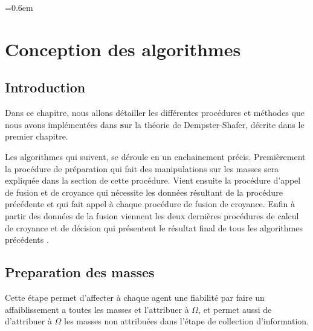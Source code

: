 \parskip=0.6em
\chapter{Conception des algorithmes}


\section*{Introduction}

Dans ce chapitre, nous allons détailler les différentes procédures et méthodes que nous avons implémentées dans \textbf sur la théorie de Dempster-Shafer, décrite dans le premier chapitre.

Les algorithmes qui suivent, se déroule en un enchainement précis.
Premièrement la procédure de préparation qui fait des manipulations sur les masses sera expliquée dans la section de cette procédure. Vient ensuite la procédure d'appel de fusion et de croyance qui nécessite les données résultant de la procédure précédente et qui fait appel à chaque procédure de fusion de croyance. Enfin à partir des données de la fusion viennent les deux dernières procédures de calcul de croyance et de décision qui présentent le résultat final de tous les algorithmes précédents .
{}

\DontPrintSemicolon
\section{Preparation des masses}
Cette étape permet d'affecter à chaque agent une fiabilité par faire un affaiblissement a toutes les masses et l'attribuer à $\Omega$, et permet aussi de d'attribuer à $\Omega$ les masses non attribuées dans l'étape de collection d'information.   

